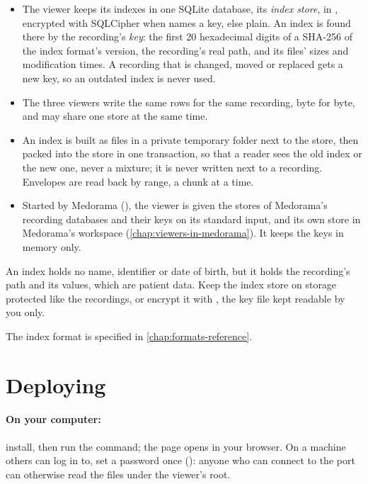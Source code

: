 \begin{itemize}
\item The viewer keeps its indexes in one SQLite database, its \emph{index store},
   in , encrypted with SQLCipher when
   names a key, else plain. An index is found there by the recording's
  \emph{key}: the first 20 hexadecimal digits of a SHA-256 of the index format's version, the
  recording's real path, and its files' sizes and modification times. A recording that is changed, moved or replaced gets a new
  key, so an outdated index is never used.
\item The three viewers write the same rows for the same recording, byte for byte, and may share
  one store at the same time.
\item An index is built as files in a private temporary folder next to the store, then packed
  into the store in one transaction, so that a reader sees the old index or the new one, never a
  mixture; it is never written next to a recording. Envelopes are read back by range, a chunk at
  a time.
\item Started by Medorama (), the viewer is given the stores of
  Medorama's recording databases and their keys on its standard input, and its own store in
  Medorama's workspace (\cref{chap:viewers-in-medorama}). It keeps the keys in memory only.
\end{itemize}

\begin{phibox}
An index holds no name, identifier or date of birth, but it holds the recording's path and its
values, which are patient data. Keep the index store on storage protected like the recordings,
or encrypt it with , the key file kept readable by you only.
\end{phibox}

The index format is specified in \cref{chap:formats-reference}.

\section{Deploying}
\label{sec:vitalstream-deploy}

\paragraph{On your computer:} install, then run the command; the page opens in your browser. On a
machine others can log in to, set a password once (): anyone who can connect
to the port can otherwise read the files under the viewer's root.

